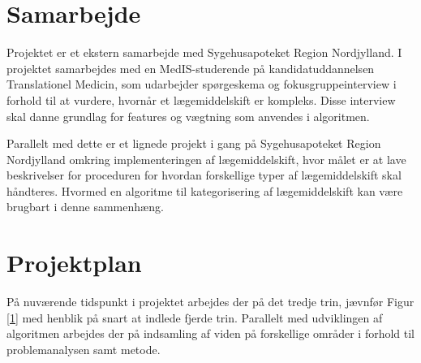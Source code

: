 \section{Samarbejde}
Projektet er et ekstern samarbejde med Sygehusapoteket Region Nordjylland. I projektet samarbejdes med en MedIS-studerende på kandidatuddannelsen Translationel Medicin, som udarbejder spørgeskema og fokusgruppeinterview i forhold til at vurdere, hvornår et lægemiddelskift er kompleks. Disse interview skal danne grundlag for features og vægtning som anvendes i algoritmen. 

Parallelt med dette er et lignede projekt i gang på Sygehusapoteket Region Nordjylland omkring implementeringen af lægemiddelskift, hvor målet er at lave beskrivelser for proceduren for hvordan forskellige typer af lægemiddelskift skal håndteres. Hvormed en algoritme til kategorisering af lægemiddelskift kan være brugbart i denne sammenhæng. 

\section{Projektplan}
På nuværende tidspunkt i projektet arbejdes der på det tredje trin, jævnfør Figur \ref{1} med henblik på snart at indlede fjerde trin. Parallelt med udviklingen af algoritmen arbejdes der på indsamling af viden på forskellige områder i forhold til problemanalysen samt metode.




